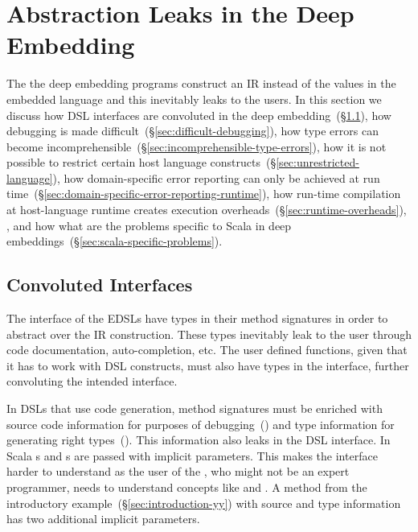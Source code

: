\section{Abstraction Leaks in the Deep Embedding}
\label{sec:abstraction-leaks}

The the deep embedding programs construct an IR instead of the values in the embedded language and this inevitably leaks to the users. In this section we discuss how DSL interfaces are convoluted in the deep embedding~(\S \ref{sec:convoluted-interfaces}), how debugging is made difficult~(\S \ref{sec:difficult-debugging}), how type errors can
become incomprehensible~(\S \ref{sec:incomprehensible-type-errors}), how it is not possible
to restrict certain host language constructs~(\S \ref{sec:unrestricted-language}), how
domain-specific error reporting can only be achieved at run time~(\S \ref{sec:domain-specific-error-reporting-runtime}),
how run-time compilation at host-language runtime creates execution overheads~(\S \ref{sec:runtime-overheads}), , and
how what are the problems specific to Scala in deep embeddings~(\S \ref{sec:scala-specific-problems}).


\subsection{Convoluted Interfaces}
\label{sec:convoluted-interfaces}

The interface of the EDSLs have  types in their method signatures in order
 to abstract over the IR construction. These  types inevitably leak to
 the user through code documentation, auto-completion, etc. The user defined functions,
 given that it has to work with DSL constructs, must also have  types
 in the interface, further convoluting the intended interface.

In DSLs that use code generation, method signatures must be
 enriched with source code information for purposes of debugging~()
 and type information for generating right types~(). This information also
 leaks in the DSL interface. In Scala s and s are
 passed with implicit parameters. This makes the interface harder to understand as the user of
 the \edsl{}, who might not be an expert programmer, needs to understand concepts
 like  and . A method  from the introductory example~(\S \ref{sec:introduction-yy}) with source and type information has two additional implicit parameters.

